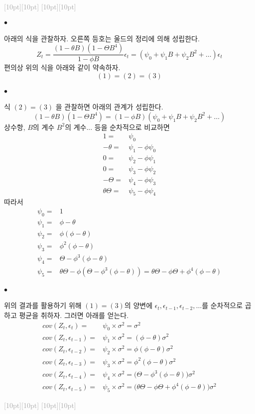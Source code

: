 \documentclass[12pt,oneside,english]{book}
\newcommand{\rdash}{\noindent \textcolor{darkgray}{ \raisebox{-1.9pt}[10pt][10pt]{\leafright} \hrulefill \raisebox{-1.9pt}[10pt][10pt]{\leafright \decofourleft \decothreeleft  \aldineright \decotwo \floweroneleft \decoone}}}
\def\ck{\paragraph{\Large$\bullet$}\Large}
\begin{document}
\rdash

\ck 아래의 식을 관찰하자. 오른쪽 등호는 울드의 정리에 의해 성립한다. 
\[
Z_t=\frac{(1-\theta B)(1-\Theta B^4)}{1-\phi B}\epsilon_t=(\psi_0+\psi_1 B+\psi_2 B^2 +\dots )\epsilon_{t}
\]
편의상 위의 식을 아래와 같이 약속하자. 
\[
(1)=(2)=(3)
\]

\ck 식 $(2)=(3)$ 을 관찰하면 아래의 관계가 성립한다. 
\[
(1-\theta B)(1-\Theta B^4)=(1-\phi B)(\psi_0+\psi_1 B+\psi_2 B^2+\dots)
\]
상수항, $B$의 계수 $B^2$의 계수... 등을 순차적으로 비교하면 
\begin{align*}
1=&\psi_0 \\ 
-\theta=&\psi_1-\phi\psi_0 \\ 
0=&\psi_2-\phi\psi_1 \\
0=&\psi_3-\phi\psi_2 \\
-\Theta=&\psi_4-\phi\psi_3 \\
\theta\Theta=&\psi_5-\phi\psi_4 
\end{align*}
따라서 
\begin{align*}
\psi_0=&1 \\
\psi_1=&\phi-\theta \\ 
\psi_2=&\phi(\phi-\theta) \\
\psi_3=&\phi^2(\phi-\theta) \\
\psi_4=&\Theta-\phi^3(\phi-\theta) \\
\psi_5=&\theta\Theta-\phi(\Theta-\phi^3(\phi-\theta))=\theta\Theta-\phi\Theta+\phi^4(\phi-\theta)
\end{align*}

\ck 위의 결과를 활용하기 위해 $(1)=(3)$의 양변에 $\epsilon_t,\epsilon_{t-1},\epsilon_{t-2},\dots$를 순차적으로 곱하고 평균을 취하자. 그러면 아래를 얻는다. 
\begin{align*}
cov(Z_t,\epsilon_t)=&\psi_0 \times \sigma^2=\sigma^2 \\
cov(Z_t,\epsilon_{t-1})=&\psi_1\times \sigma^2=(\phi-\theta)\sigma^2 \\ 
cov(Z_t,\epsilon_{t-2})=&\psi_2\times \sigma^2=\phi(\phi-\theta) \sigma^2\\
cov(Z_t,\epsilon_{t-3})=&\psi_3\times \sigma^2=\phi^2(\phi-\theta)\sigma^2 \\
cov(Z_t,\epsilon_{t-4})=&\psi_4\times \sigma^2=\big(\Theta-\phi^3(\phi-\theta)\big)\sigma^2 \\
cov(Z_t,\epsilon_{t-5})=&\psi_5\times \sigma^2=\big(\theta\Theta-\phi\Theta+\phi^4(\phi-\theta)\big)\sigma^2
\end{align*}

\rdash 
\end{document}
